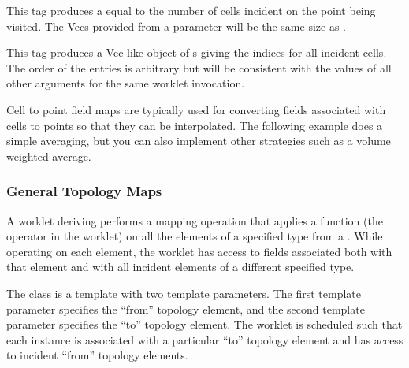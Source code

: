 \begin{description}
  \numericexecutionsignaturetags

\item[\sigtag{CellCount}] This tag produces a  equal to
  the number of cells incident on the point being visited. The Vecs
  provided from a  parameter will be the same
  size as .

\item[\sigtag{CellIndices}] This tag produces a Vec-like object of
  s giving the indices for all incident cells. The
  order of the entries is arbitrary but will be consistent with the values
  of all other  arguments for the same worklet
  invocation.

  \commonexecutionsignaturetags
\end{description}

Cell to point field maps are typically used for converting fields
associated with cells to points so that they can be interpolated. The
following example does a simple averaging, but you can also implement other
strategies such as a volume weighted average.



\subsubsection{General Topology Maps}
\label{sec:WorkletMapTopology}


A worklet deriving  performs a mapping
operation that applies a function (the operator in the worklet) on all the
elements of a specified type from a . While
operating on each element, the worklet has access to fields associated both
with that element and with all incident elements of a different specified
type.

The  class is a template with two
template parameters. The first template parameter specifies the ``from''
topology element, and the second template parameter specifies the ``to''
topology element. The worklet is scheduled such that each instance is
associated with a particular ``to'' topology element and has access to
incident ``from'' topology elements.

